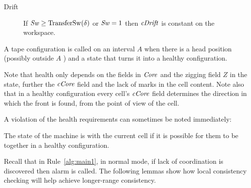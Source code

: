\documentclass[12pt]{memoir}
\renewcommand{\ge}{\geq}
\newcommand{\fld}[1]{\ensuremath{\textit{#1\/}}}
\newcommand{\Z}{Z}
\newcommand{\Core}{\fld{Core}}
\newcommand{\cCore}{\fld{cCore}}
\newcommand{\cDrift}{\fld{cDrift}}
\newcommand{\cInfo}{\fld{cInfo}}
\newcommand{\cState}{\fld{cState}}
\newcommand{\Sweep}{\fld{Sw}}
\newcommand{\TransferSw}{\mathrm{TransferSw}}
\begin{document}
\begin{definition}
\begin{description}





        \item[Drift]%
         If \( \Sweep \ge \TransferSw(\delta) \) or \( \Sweep=1 \) then \( \cDrift \)
         is constant on the workspace.

   \end{description}

A tape configuration is called  on an interval \( A \)
when there is a head position (possibly outside \( A \) ) and a 
state that turns it into a healthy configuration.
 \end{definition}

Note that health only depends on the fields in \( \Core \) and
the zigging field \( \Z \) in the state, further the  \( \cCore \) field
and the lack of marks in the cell content.
Note also that in a healthy configuration every cell's \( \cCore \) field
determines the direction in which the front is found, from the point of
view of the cell.

A violation of the health requirements can sometimes be noted immediately:

\begin{definition}[Coordination] \label{def:coordinated}
   The state of the machine is  with the current cell
   if it is possible for them to be together in a healthy configuration.
\end{definition}

Recall that in Rule~\ref{alg:main1}, in normal mode,
if lack of coordination is discovered then alarm is called.
The  following lemmas show 
how local consistency checking will help achieve longer-range consistency.
\end{document}
